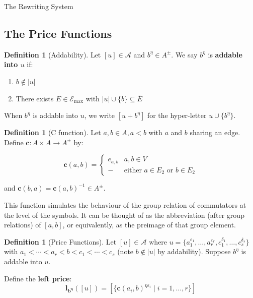 \documentclass{article}
\theoremstyle{definition}
\newtheorem{definition}[theorem]{Definition}
\theoremstyle{remark}
\theoremstyle{theorem}
\theoremstyle{definition}
\begin{document}
\begin{section}{The Rewriting System}

\subsection{The Price Functions}

\begin{definition}[Addability]
Let $[u] \in \mathcal{A}$ and $b^{\eta} \in A^{\pm}$. We say $b^{\eta}$ is \textbf{addable into $u$} if:
\begin{enumerate}
    \item $b \notin |u|$
    \item There exists $E \in \mathcal{E}_{\max}$ with $|u| \cup \{b\} \subseteq \bar{E}$
\end{enumerate}

When $b^{\eta}$ is addable into $u$, we write $[u + b^{\eta}]$ for the hyper-letter $u \cup \{b^{\eta}\}$.
\end{definition}

\begin{definition}[C function]
    Let $a,b\in A, a<b$ with $a$ and $b$ sharing an edge. Define $\mathbf{c}:A\times A \rightarrow A^{\pm}$ by:
    
    $$\mathbf{c}(a,b)=\begin{cases}
        e_{a,b} & a,b\in V
        \\
        - & \text{either }a\in E_2 \text{ or } b\in E_2
    \end{cases}$$

    and $\mathbf{c}(b,a)= \mathbf{c}(a,b)^{-1} \in A^{\pm}$.

    This function simulates the behaviour of the group relation of commutators at the level of the symbols. It can be thought of as the abbreviation (after group relations) of $[a,b]$, or equivalently, as the preimage of that group element.
\end{definition}


\begin{definition}[Price Functions]\label{def:price}
Let $[u] \in \mathcal{A}$ where $u = \{a_1^{\varepsilon_1}, \ldots, a_r^{\varepsilon_r}, c_1^{\delta_1}, \ldots, c_s^{\delta_s}\}$ with $a_1 < \cdots < a_r < b < c_1 < \cdots < c_s$ (note $b \notin |u|$ by addability). Suppose $b^{\eta}$ is addable into $u$.

Define the \textbf{left price}:
$$\mathbf{l_{b^{\eta}}}([u]) = [\{\mathbf{c}(a_i, b)^{\eta \varepsilon_i} \mid i=1,\ldots,r \}]$$


\end{definition}
\end{section}
\end{document}
